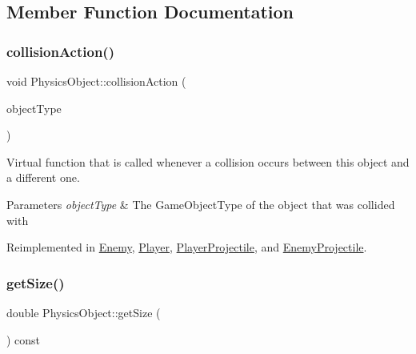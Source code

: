 \subsection{Member Function Documentation}
\mbox{\label{class_physics_object_a16163f4e5bf781b3814d024c9f44a276}} 
\subsubsection{\texorpdfstring{collision\+Action()}{collisionAction()}}
{\footnotesize\ttfamily void Physics\+Object\+::collision\+Action (\begin{DoxyParamCaption}\item[{const Game\+Object\+Type \&}]{object\+Type }\end{DoxyParamCaption})\hspace{0.3cm}{\ttfamily [virtual]}}



Virtual function that is called whenever a collision occurs between this object and a different one. 


\begin{DoxyParams}{Parameters}
{\em object\+Type} & The Game\+Object\+Type of the object that was collided with \\
\hline
\end{DoxyParams}


Reimplemented in \hyperlink{class_enemy_ac59660a58fac8d0ffdcb97c0717fa089}{Enemy}, \hyperlink{class_player_a1089079d7149a7fce6226935a6ce2f9c}{Player}, \hyperlink{class_player_projectile_a22fcdd7296d95b97ae60b4d20d8a57bd}{Player\+Projectile}, and \hyperlink{class_enemy_projectile_a4b3233a5ba7a3df66070cd6cdaa0362a}{Enemy\+Projectile}.

\mbox{\label{class_physics_object_adc592e9846ebedea3d58d50c5ada1c12}} 
\subsubsection{\texorpdfstring{get\+Size()}{getSize()}}
{\footnotesize\ttfamily double Physics\+Object\+::get\+Size (\begin{DoxyParamCaption}{ }\end{DoxyParamCaption}) const}



